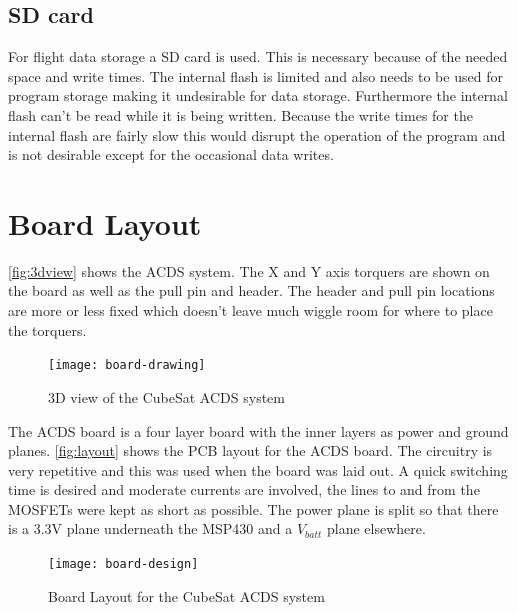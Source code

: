 \subsection{SD card}

For flight data storage a SD card is used. This is necessary because of the needed space and write times. The internal flash is limited and also needs to be used for program storage making it undesirable for data storage. Furthermore the internal flash can't be read while it is being written. Because the write times for the internal flash are fairly slow this would disrupt the operation of the program and is not desirable except for the occasional data writes.

\section{Board Layout}

\autoref{fig:3dview} shows the \ac{ACDS} system. The X and Y axis torquers are shown on the board as well as the pull pin and header. The header and pull pin locations are more or less fixed which doesn't leave much wiggle room for where to place the torquers.

\begin{figure}[H]
    \centering
    \texttt{[image: board-drawing]}
    \caption{3D view of the CubeSat \acs{ACDS} system}
    \label{fig:3dview}
\end{figure}

The \ac{ACDS} board is a four layer board with the inner layers as power and ground planes. \autoref{fig:layout} shows the \ac{PCB} layout for the \ac{ACDS} board. The circuitry is very repetitive and this was used when the board was laid out. A quick switching time is desired and moderate currents are involved, the lines to and from the \acp{MOSFET} were kept as short as possible. The power plane is split so that there is a 3.3V plane underneath the MSP430 and a $V_{batt}$ plane elsewhere.

\begin{figure}[H]
    \centering
    \texttt{[image: board-design]}
    \caption{Board Layout for the CubeSat \acs{ACDS} system}
    \label{fig:layout}
\end{figure}

